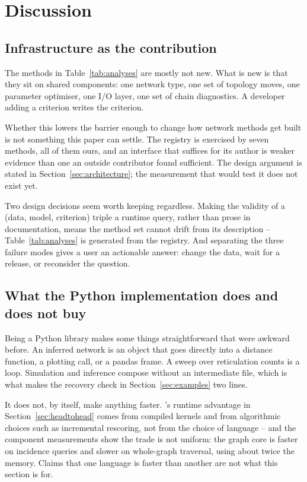 \section{Discussion}
\label{sec:discussion}

\subsection{Infrastructure as the contribution}

The methods in Table~\ref{tab:analyses} are mostly not new. What is new is that
they sit on shared components: one network type, one set of topology moves, one
parameter optimiser, one I/O layer, one set of chain diagnostics. A developer
adding a criterion writes the criterion.

Whether this lowers the barrier enough to change how network methods get built is
not something this paper can settle. The registry is exercised by seven methods,
all of them ours, and an interface that suffices for its author is weaker
evidence than one an outside contributor found sufficient. The design argument is
stated in Section~\ref{sec:architecture}; the measurement that would test it does
not exist yet.

Two design decisions seem worth keeping regardless. Making the validity of a
(data, model, criterion) triple a runtime query, rather than prose in
documentation, means the method set cannot drift from its description --
Table~\ref{tab:analyses} is generated from the registry. And separating the three
failure modes gives a user an actionable answer: change the data, wait for a
release, or reconsider the question.

\subsection{What the Python implementation does and does not buy}

Being a Python library makes some things straightforward that were awkward
before. An inferred network is an object that goes directly into a distance
function, a plotting call, or a pandas frame. A sweep over reticulation counts is
a loop. Simulation and inference compose without an intermediate file, which is
what makes the recovery check in Section~\ref{sec:examples} two lines.

It does not, by itself, make anything faster. \phynetpy's runtime advantage in
Section~\ref{sec:headtohead} comes from compiled kernels and from algorithmic
choices such as incremental rescoring, not from the choice of language -- and the
component measurements show the trade is not uniform: the graph core is faster on
incidence queries and slower on whole-graph traversal, using about twice the
memory. Claims that one language is faster than another are not what this section
is for.

